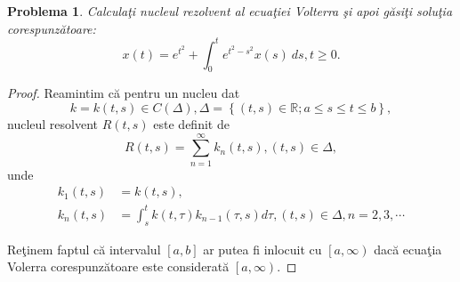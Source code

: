 \documentclass[a4paper,12pt,oneside]{report}
\newtheorem{problem}{Problema}
\begin{document}
\begin{problem}
Calcula\c{t}i nucleul rezolvent al ecua\c{t}iei Volterra \c{s}i apoi g\u{a}si\c{t}i solu\c{t}ia corespunz\u{a}toare:
\[x\left ( t \right ) = e^{t^{2}} + \int_{0}^{t}e^{t^{2} - s^{2}}x\left ( s \right )\ ds , t\geq 0.\]
\end{problem}	
\begin{proof}
Reamintim c\u{a} pentru un nucleu dat
\begin{displaymath}
  k = k\left ( t,s \right ) \in C\left ( \Delta  \right ),  \Delta = \left \{ \left ( t,s \right ) \in \mathbb{R}; a\leq s\leq t\leq b \right \},
\end{displaymath}
nucleul resolvent \(R \left ( t,s \right )\) este definit de
\begin{displaymath}
R \left ( t,s \right ) = \sum_{n = 1}^{\infty } k_{n}\left ( t,s \right ), \left ( t,s \right ) \in \Delta,
\end{displaymath}
unde
\begin{equation} \nonumber
    \begin{split}
       k_{1}\left ( t,s \right ) & = k\left ( t,s \right ), \\
       k_{n}\left ( t,s \right ) & = \int_{s}^{t}k\left ( t,\tau  \right )k_{n-1}\left ( \tau ,s \right )d\tau , \left ( t,s \right ) \in \Delta , n = 2,3,\cdots
    \end{split}
\end{equation}

        		      		      		
Re\c{t}inem faptul c\u{a} intervalul \(\left [ a,b \right ]\) ar putea fi inlocuit cu \(\left [ a,\infty  \right )\) dac\u{a} ecua\c{t}ia Volerra corespunz\u{a}toare este considerat\u{a} \(\left [ a,\infty  \right )\).


\end{proof}
\end{document}
